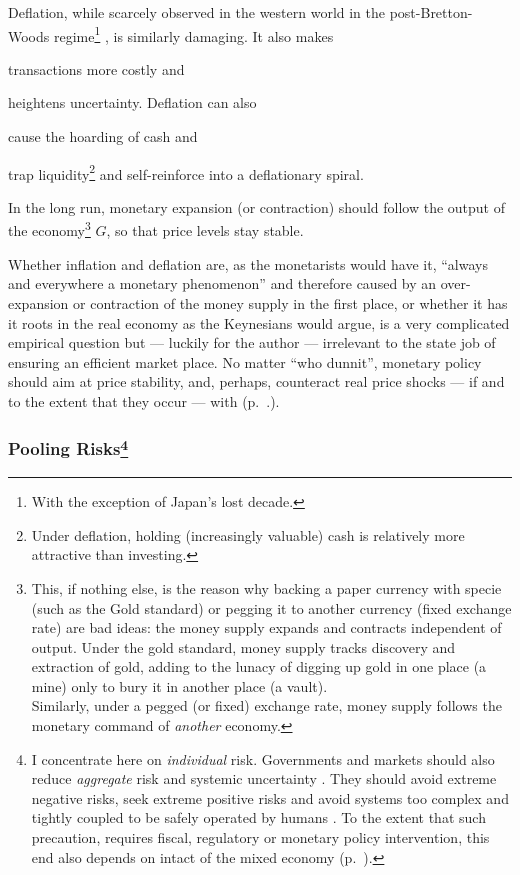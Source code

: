 Deflation, while scarcely observed in the western world in the post-Bretton-Woods regime\footnote{
	With the exception of Japan's lost decade.}%
, is similarly damaging. It also makes \begin{inparaenum}[\itshape 1\upshape)]
	\item transactions more costly and 
	\item heightens uncertainty. Deflation can also 
	\item cause the hoarding of cash and 
	\item trap liquidity\footnote{
		Under deflation, holding (increasingly valuable) cash is relatively more attractive than investing.} 
	and self-reinforce into a deflationary spiral.
	\end{inparaenum}

In the long run, monetary expansion (or contraction) should follow the output of the economy\footnote{
	This, if nothing else, is the reason why backing a paper currency with specie (such as the Gold standard) or pegging it to another currency (fixed exchange rate) are bad ideas: the money supply expands and contracts independent of output. Under the gold standard, money supply tracks discovery and extraction of gold, adding to the lunacy of digging up gold in one place (a mine) only to bury it in another place (a vault). \\ 
	Similarly, under a pegged (or fixed) exchange rate, money supply follows the monetary command of \emph{another} economy.} 
$G$, so that price levels stay stable.

Whether inflation and deflation are, as the monetarists would have it, ``always and everywhere a monetary phenomenon'' \citep{Friedman1970} %
and therefore caused by an over-expansion or contraction of the money supply in the first place, or whether it has it roots in the real economy as the Keynesians would argue, is a very complicated empirical question but --- luckily for the author --- irrelevant to the state job of ensuring an efficient market place. No matter ``who dunnit'', monetary policy should aim at price stability, and, perhaps, counteract real price shocks --- if and to the extent that they occur --- with  (p.~\pageref{sec:monetary-stimulus}.).%

\subsubsection[Pooling Risks]{Pooling Risks\footnote{
	I concentrate here on \emph{individual} risk. Governments and markets should also reduce \emph{aggregate} risk and systemic uncertainty \citep{Knight1921}. They should avoid extreme negative risks, seek extreme positive risks \citep{Taleb2007} and avoid systems too complex and tightly coupled to be safely operated by humans \citep{Perrow-1999-aa}. To the extent that such precaution, requires fiscal, regulatory or monetary policy intervention, this end also depends on intact  of the mixed economy (p.~\pageref{sec:means}).}}
	\label{sec:risk}


